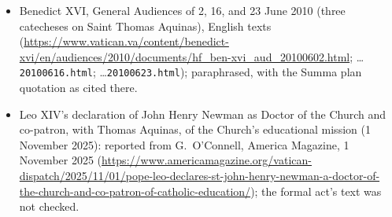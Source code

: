 \begin{itemize}
\item Benedict XVI, General Audiences of 2, 16, and 23 June 2010 (three
catecheses on Saint Thomas Aquinas), English texts
(\url{https://www.vatican.va/content/benedict-xvi/en/audiences/2010/documents/hf_ben-xvi_aud_20100602.html};
\ldots\texttt{20100616.html}; \ldots\texttt{20100623.html});
paraphrased, with the Summa plan quotation as cited there.
\item Leo XIV's declaration of John Henry Newman as Doctor of the Church
and co-patron, with Thomas Aquinas, of the Church's educational mission
(1 November 2025): reported from G.~O'Connell, America Magazine, 1
November 2025
(\url{https://www.americamagazine.org/vatican-dispatch/2025/11/01/pope-leo-declares-st-john-henry-newman-a-doctor-of-the-church-and-co-patron-of-catholic-education/});
the formal act's text was not checked.
\end{itemize}

\endgroup
